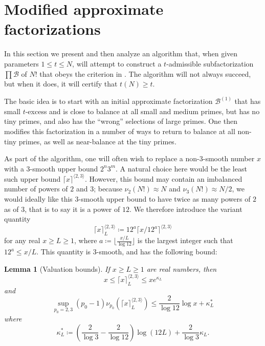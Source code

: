 \documentclass[12pt,a4paper,reqno]{amsart}
\numberwithin{equation}{section}
\theoremstyle{plain}
\newtheorem{lemma}[theorem]{Lemma}
\theoremstyle{definition}
\newcommand\tuple{{\mathcal B}}
\begin{document}
\section{Modified approximate factorizations}\label{approx-sec}

In this section we present and then analyze an algorithm that, when given parameters $1 \leq t \leq N$, will attempt to construct a $t$-admissible subfactorization $\prod \tuple$ of $N!$ that obeys the criterion in .  The algorithm will not always succeed, but when it does, it will certify that $t(N) \geq t$.

The basic idea is to start with an initial approximate factorization $\tuple^{(1)}$ that has small $t$-excess and is close to balance at all small and medium primes, but has no tiny primes, and also has the ``wrong'' selections of large primes.  One then modifies this factorization in a number of ways to return to balance at all non-tiny primes, as well as near-balance at the tiny primes. 

As part of the algorithm, one will often wish to replace a non-$3$-smooth number $x$ with a $3$-smooth upper bound $2^n 3^m$.  A natural choice here would be the least such upper bound $\lceil x \rceil^{\langle 2,3 \rangle}$.  However, this bound may contain an imbalanced number of powers of $2$ and $3$; because $\nu_2(N!) \approx N$ and $\nu_3(N!) \approx N/2$, we would ideally like this $3$-smooth upper bound to have twice as many powers of $2$ as of $3$, that is to say it is a power of $12$.  We therefore introduce the variant quantity
$$ \lceil x \rceil^{\langle 2,3\rangle}_L \coloneqq 12^a \lceil x/12^a \rceil^{\langle 2,3 \rangle}$$
for any real $x \geq L \geq 1$, where $a \coloneqq \lfloor \frac{x/L}{\log 12} \rfloor$ is the largest integer such that $12^a \leq x/L$.  This quantity is $3$-smooth, and has the following bound:

\begin{lemma}[Valuation bounds]\label{val} If $x \geq L \geq 1$ are real numbers, then
$$ x \leq \lceil x \rceil^{\langle 2,3\rangle}_L \leq x e^{\kappa_L}$$
and
$$ \sup_{p_0=2,3} (p_0-1) \nu_{p_0}(\lceil x \rceil^{\langle 2,3\rangle}_L) \leq \frac{2}{\log 12} \log x + \kappa^*_L$$
where
\begin{equation}\label{kappastar-def}
\kappa^*_L \coloneqq (\frac{2}{\log 3} - \frac{2}{\log 12}) \log(12L) + \frac{2}{\log 3} \kappa_L.
\end{equation}
\end{lemma}
\end{document}
